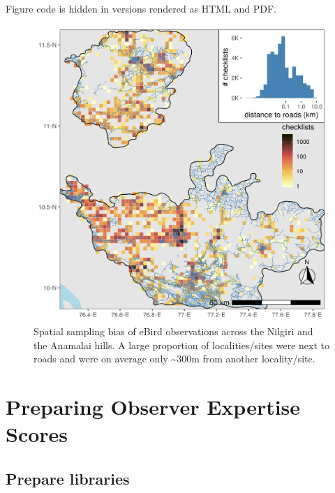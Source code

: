 \documentclass[]{article}
\begin{document}
Figure code is hidden in versions rendered as HTML and PDF.

\begin{figure}
\centering
\includegraphics{figs/fig_03_distance_to_roads.png}
\caption{Spatial sampling bias of eBird observations across the Nilgiri and the Anamalai hills. A large proportion of localities/sites were next to roads and were on average only \textasciitilde{}300m from another locality/site.}
\end{figure}

\hypertarget{preparing-observer-expertise-scores}{%
\section{Preparing Observer Expertise Scores}\label{preparing-observer-expertise-scores}}

\hypertarget{prepare-libraries-2}{%
\subsection{Prepare libraries}\label{prepare-libraries-2}}
\end{document}
